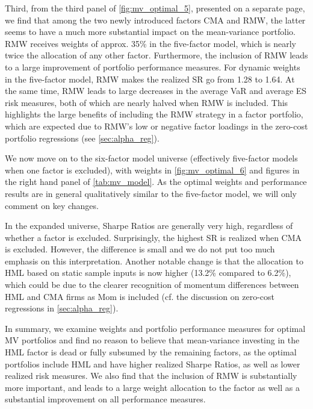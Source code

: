 Third, from the third panel of \autoref{fig:mv_optimal_5}, presented on a separate page, we find that among the two newly introduced factors CMA and RMW, the latter seems to have a much more substantial impact on the mean-variance portfolio. RMW receives weights of approx. 35\% in the five-factor model, which is nearly twice the allocation of any other factor. Furthermore, the inclusion of RMW leads to a large improvement of portfolio performance measures. For dynamic weights in the five-factor model, RMW makes the realized SR go from 1.28 to 1.64. At the same time, RMW leads to large decreases in the average VaR and average ES risk measures, both of which are nearly halved when RMW is included. This highlights the large benefits of including the RMW strategy in a factor portfolio, which are expected due to RMW's low or negative factor loadings in the zero-cost portfolio regressions (see \autoref{sec:alpha_reg}).

We now move on to the six-factor model universe (effectively five-factor models when one factor is excluded), with weights in \autoref{fig:mv_optimal_6} and figures in the right hand panel of \autoref{tab:mv_model}. As the optimal weights and performance results are in general qualitatively similar to the five-factor model, we will only comment on key changes.

In the expanded universe, Sharpe Ratios are generally very high, regardless of whether a factor is excluded. Surprisingly, the highest SR is realized when CMA is excluded. However, the difference is small and we do not put too much emphasis on this interpretation. Another notable change is that the allocation to HML based on static sample inputs is now higher (13.2\% compared to 6.2\%), which could be due to the clearer recognition of momentum differences between HML and CMA firms as Mom is included (cf. the discussion on zero-cost regressions in \autoref{sec:alpha_reg}). 

In summary, we examine weights and portfolio performance measures for optimal MV portfolios and find no reason to believe that mean-variance investing in the HML factor is dead or fully subsumed by the remaining factors, as the optimal portfolios include HML and have higher realized Sharpe Ratios, as well as lower realized risk measures. We also find that the inclusion of RMW is substantially more important, and leads to a large weight allocation to the factor as well as a substantial improvement on all performance measures.

